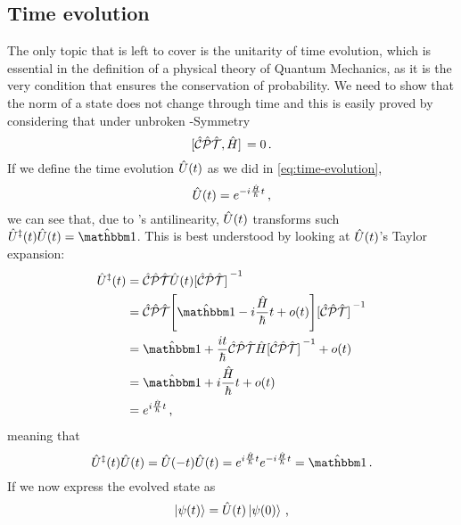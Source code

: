         \subsection{Time evolution}
            The only topic that is left to cover is the unitarity of time evolution, which is essential in the definition of a physical theory of Quantum Mechanics, as it is the very condition that ensures the conservation of probability. We need to show that the norm of a state does not change through time and this is easily proved by considering that under unbroken \PT-Symmetry
            \begin{equation}
                \comm*{\hCPT}{\hH} = 0
                \myperiod
            \end{equation}
            If we define the time evolution $\hU\pqty{t}$ as we did in \eqref{eq:time-evolution},
            \begin{equation*}
                \hU\pqty{t} = \myexp{-i\frac{\hH}{\hbar}t}
                \mycomma
            \end{equation*}
            we can see that, due to \hPT's antilinearity, $\hU\pqty{t}$ transforms such $\hU^\myconj\pqty{t} \hU\pqty{t} = \hidM$. This is best understood by looking at $\hU\pqty{t}$'s Taylor expansion:
            \begin{align*}
                \hU^\myconj\pqty{t}
                &= \CPTtransform{\hU\pqty{t}} \\
                &= \CPTtransform{\bqty{\hidM - i\frac{\hH}{\hbar}t + o\pqty{t}}} \\
                &= \hidM + \frac{it}{\hbar}\CPTtransform{\hH} + o\pqty{t}\\
                &= \hidM + i\frac{\hH}{\hbar}t + o\pqty{t}\\
                &= \myexp{i\frac{\hH}{\hbar}t}
                \mycomma
            \end{align*}
            meaning that
            \begin{equation*}
                \hU^\myconj\pqty{t} \hU\pqty{t}
                = \hU\pqty{-t} \hU\pqty{t}
                = \myexp{i\frac{\hH}{\hbar}t} \myexp{-i\frac{\hH}{\hbar}t}
                = \hidM
                \myperiod
            \end{equation*}
            If we now express the evolved state as
            \begin{equation*}
                \ket{\psi\pqty{t}} = \hU\pqty{t}\ket{\psi\pqty{0}}
                \mycomma
            \end{equation*}
